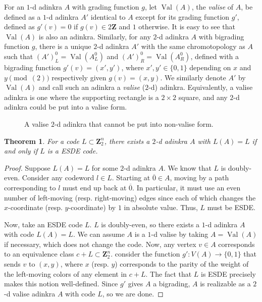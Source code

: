 \documentclass[12pt,twoside,singlespace]{article}
\numberwithin{equation}{section}
\newtheorem{thm}[equation]{Theorem}
\theoremstyle{definition}
\newcommand{\ZZ}{\mathbf{Z}}
\newcommand{\on}{\operatorname}
\newcommand{\val}{\on{Val}}
\begin{document}
For an $1$-d adinkra $A$ with grading function $g$, let $\val(A)$, the \emph{valise} of $A$, be defined as a $1$-d adinkra $A'$ identical to $A$ except for its grading function $g'$, defined as $g'(v) = 0$ if $g(v) \in 2\ZZ$ and $1$ otherwise. It is easy to see that $\val(A)$ is also an adinkra. Similarly, for any $2$-d adinkra $A$ with bigrading function $g$, there is a unique $2$-d adinkra $A'$ with the same chromotopology as $A$ such that $(A')_L^0 = \val(A_L^0)$ and $(A')_R^0 = \val(A_R^0)$, defined with a bigrading function $g'(v) = (x', y')$, where $x', y' \in \{0,1\}$ depending on $x$ and $y \pmod(2)$ respectively given $g(v) = (x,y)$. We similarly denote $A'$ by $\val(A)$ and call such an adinkra a \emph{valise} ($2$-d) adinkra. Equivalently, a valise adinkra is one where the supporting rectangle is a $2 \times 2$ square, and any $2$-d adinkra could be put into a valise form. 

\begin{figure}[htb]
\begin{center}

\caption{A valise $2$-d adinkra that cannot be put into non-valise form.\label{fig:tight valise}}
\end{center}
\end{figure}

\begin{thm}
\label{thm:esde}
For a code $L \subset \ZZ_2^n$, there exists a $2$-d adinkra $A$ with $L(A) = L$ if and only if $L$ is a ESDE code.
\end{thm}
\begin{proof}
Suppose $L(A) = L$ for some $2$-d adinkra $A$. We know that $L$ is doubly-even. Consider any codeword $l \in L$. Starting at $\overline{0} \in A$, moving by a path corresponding to $l$ must end up back at $\overline{0}$. In particular, it must use an even number of left-moving (resp. right-moving) edges since each of which changes the $x$-coordinate (resp. $y$-coordinate) by $1$ in absolute value. Thus, $L$ must be ESDE.

Now, take an ESDE code $L$. $L$ is doubly-even, so there exists a $1$-d adinkra $A$ with code $L(A) = L$. We can assume $A$ is a $1$-d valise by taking $A = \val(A)$ if necessary, which does not change the code. Now, any vertex $v \in A$ corresponds to an equivalence class $c+L \subset \ZZ_2^n.$ consider the function $g'\colon V(A) \rightarrow \{0,1\}$ that sends $v$ to $(x,y)$, where $x$ (resp. $y$) corresponds to the parity of the weight of the left-moving colors of any element in $c+L$. The fact that $L$ is ESDE precisely makes this notion well-defined. Since $g'$ gives $A$ a bigrading, $A$ is realizable as a $2$-d valise adinkra $A$ with code $L$, so we are done. 
\end{proof}
\end{document}
